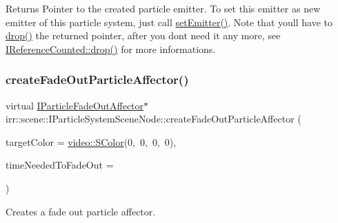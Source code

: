 \begin{DoxyReturn}{Returns}
Pointer to the created particle emitter. To set this emitter as new emitter of this particle system, just call \hyperlink{classirr_1_1scene_1_1IParticleSystemSceneNode_aececff4531482ce976f1859c40bf3f76}{set\+Emitter()}. Note that you\textquotesingle{}ll have to \hyperlink{classirr_1_1IReferenceCounted_a03856a09355b89d178090c4a5f738543}{drop()} the returned pointer, after you don\textquotesingle{}t need it any more, see \hyperlink{classirr_1_1IReferenceCounted_a03856a09355b89d178090c4a5f738543}{I\+Reference\+Counted\+::drop()} for more informations. 
\end{DoxyReturn}
\mbox{\label{classirr_1_1scene_1_1IParticleSystemSceneNode_a4a9c3ecdf6118267f312f9389bb24888}} 
\subsubsection{\texorpdfstring{create\+Fade\+Out\+Particle\+Affector()}{createFadeOutParticleAffector()}\hspace{0.1cm}{\footnotesize\ttfamily [1/2]}}
{\footnotesize\ttfamily virtual \hyperlink{classirr_1_1scene_1_1IParticleFadeOutAffector}{I\+Particle\+Fade\+Out\+Affector}$\ast$ irr\+::scene\+::\+I\+Particle\+System\+Scene\+Node\+::create\+Fade\+Out\+Particle\+Affector (\begin{DoxyParamCaption}\item[{const \hyperlink{classirr_1_1video_1_1SColor}{video\+::\+S\+Color} \&}]{target\+Color = {\ttfamily \hyperlink{classirr_1_1video_1_1SColor}{video\+::\+S\+Color}(0,~0,~0,~0)},  }\item[{\hyperlink{namespaceirr_a0416a53257075833e7002efd0a18e804}{u32}}]{time\+Needed\+To\+Fade\+Out = {} }\end{DoxyParamCaption})\hspace{0.3cm}{\ttfamily [pure virtual]}}



Creates a fade out particle affector. 


